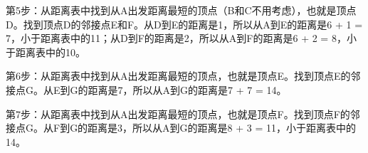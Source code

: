 第5步：从距离表中找到从A出发距离最短的顶点（B和C不用考虑），也就是顶点D。找到顶点D的邻接点E和F。从D到E的距离是1，所以从A到E的距离是6 + 1 = 7，小于距离表中的11；从D到F的距离是2，所以从A到F的距离是6 + 2 = 8，小于距离表中的10。

\begin{table}[H]
    \centering
\end{table}

第6步：从距离表中找到从A出发距离最短的顶点，也就是顶点E。找到顶点E的邻接点G。从E到G的距离是7，所以从A到G的距离是7 + 7 = 14。

\begin{table}[H]
    \centering
\end{table}

第7步：从距离表中找到从A出发距离最短的顶点，也就是顶点F。找到顶点F的邻接点G。从F到G的距离是3，所以从A到G的距离是8 + 3 = 11，小于距离表中的14。

\begin{table}[H]
    \centering
\end{table}

